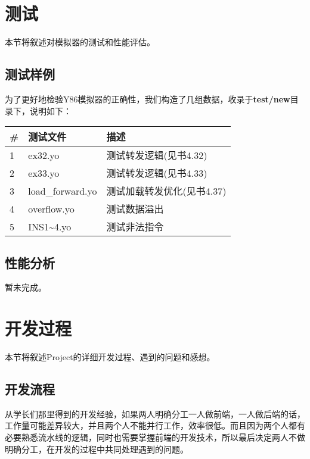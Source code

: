 \documentclass[a4paper,11pt,UTF8]{ctexart}
\begin{document}
\begin{sloppypar}
\section{测试}

本节将叙述对模拟器的测试和性能评估。

\subsection{{\bf 测试样例}}

为了更好地检验Y86模拟器的正确性，我们构造了几组数据，收录于{\bf test/new}目录下，说明如下：

\begin{table}[h]
\begin{tabular}{|l|l|l|}
\hline
{\bf \#} & {\bf 测试文件}                          & {\bf 描述}                   \\ 
\hline
1        & ex32.yo	                   & 测试转发逻辑(见书4.32)        \\ 
\hline
2        & ex33.yo                       & 测试转发逻辑(见书4.33)           \\ 
\hline
3        & load\_forward.yo	        & 测试加载转发优化(见书4.37)            \\ 
\hline
4        & overflow.yo          & 测试数据溢出               \\ 
\hline
5        & INS1\~{}4.yo             & 测试非法指令                   \\ 
\hline
\end{tabular}
\end{table}

\subsection{{\bf 性能分析}}

暂未完成。

\clearpage
\section{开发过程}

本节将叙述Project的详细开发过程、遇到的问题和感想。

\subsection{{\bf 开发流程}}

从学长们那里得到的开发经验，如果两人明确分工一人做前端，一人做后端的话，工作量可能差异较大，并且两个人不能并行工作，效率很低。而且因为两个人都有必要熟悉流水线的逻辑，同时也需要掌握前端的开发技术，所以最后决定两人不做明确分工，在开发的过程中共同处理遇到的问题。


\end{sloppypar}
\end{document}
